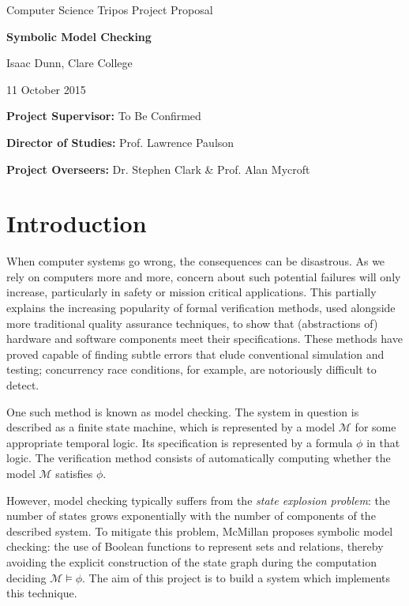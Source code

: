 \documentclass[12pt,a4paper,twoside]{article}
\newcommand{\M}{\mathcal{M}}
\begin{document}
\vfil

\centerline{\Large Computer Science Tripos Project Proposal}
\vspace{0.4in}
\centerline{\LARGE\bf Symbolic Model Checking}
\vspace{0.4in}
\centerline{\large Isaac Dunn, Clare College}
\vspace{0.3in}
\centerline{\large 11 October 2015}

\vfil


\noindent
{\bf Project Supervisor:} To Be Confirmed
\vspace{0.2in}

\noindent
{\bf Director of Studies:} Prof. Lawrence Paulson
\vspace{0.2in}
\noindent
 
\noindent
{\bf Project Overseers:} Dr. Stephen Clark  \& Prof. Alan Mycroft



\section*{Introduction}

When computer systems go wrong, the consequences can be disastrous.
As we rely on computers more and more, concern about such potential
failures will only increase, particularly in safety or mission critical applications.
This partially explains the increasing popularity of formal verification
methods, used alongside more traditional quality
assurance techniques, to show that (abstractions of)
hardware and software components meet their specifications. These methods
have proved capable of finding subtle errors that elude conventional
simulation and testing; concurrency race conditions, for example,
are notoriously difficult to detect.

One such method is known as model checking. The system in question
is described as a finite state machine, which is represented by a model $\M$ for
some appropriate temporal logic. Its specification is represented
by a formula $\phi$ in that logic. The verification
method consists of automatically computing whether the
model $\M$ satisfies $\phi$.

However, model checking typically suffers from the {\em state
explosion problem}: the number of states grows
exponentially with the number of components of the described system.
To mitigate this problem, McMillan \cite{mcmillan92}
proposes symbolic model checking: the use of Boolean functions
to represent sets and relations, thereby avoiding the explicit construction of
the state graph during the computation deciding $\M \models \phi$.
The aim of this project is to build a system which implements this technique.
\end{document}
